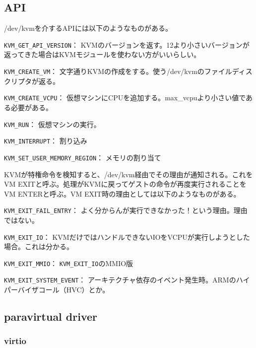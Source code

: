﻿\documentclass[9pt,b5paper,tombo,openany]{jsbook}
\begin{document}
\subsection{API}

/dev/kvmを介するAPIには以下のようなものがある。

\begin{description}
  \item{\verb|KVM_GET_API_VERSION|：}
    KVMのバージョンを返す。12より小さいバージョンが返ってきた場合はKVMモジュールを使わない方がいいらしい。
  \item{\verb|KVM_CREATE_VM|：}
    文字通りKVMの作成をする。使う/dev/kvmのファイルディスクリプタが返る。
  \item{\verb|KVM_CREATE_VCPU|：}
    仮想マシンにCPUを追加する。max\_vcpuより小さい値である必要がある。
  \item{\verb|KVM_RUN|：}
    仮想マシンの実行。
  \item{\verb|KVM_INTERRUPT|：}
    割り込み
  \item{\verb|KVM_SET_USER_MEMORY_REGION|：}
    メモリの割り当て
\end{description}

KVMが特権命令を検知すると、/dev/kvm経由でその理由が通知される。これをVM EXITと呼ぶ。処理がKVMに戻ってゲストの命令が再度実行されることをVM ENTERと呼ぶ。VM EXIT時の理由としては以下のようなものがある。

\begin{description}
  \item{\verb|KVM_EXIT_FAIL_ENTRY|：}
    よく分からんが実行できなかった！という理由。理由ではない。
  \item{\verb|KVM_EXIT_IO|：}
    KVMだけではハンドルできないIOをVCPUが実行しようとした場合。これは分かる。
  \item{\verb|KVM_EXIT_MMIO|：}
    \verb|KVM_EXIT_IO|のMMIO版
  \item{\verb|KVM_EXIT_SYSTEM_EVENT|：}
    アーキテクチャ依存のイベント発生時。ARMのハイパーバイザコール（HVC）とか。
\end{description}

\subsection{paravirtual driver}

\subsubsection{virtio}
\end{document}
